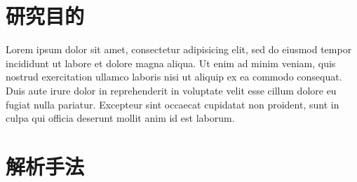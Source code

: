 \documentclass[a4j,10pt, twocolumn]{jarticle}
\begin{document}
\section{研究目的}
Lorem ipsum dolor sit amet, consectetur adipisicing elit, sed do eiusmod tempor incididunt ut labore et dolore magna aliqua. Ut enim ad minim veniam, quis nostrud exercitation ullamco laboris nisi ut aliquip ex ea commodo consequat. Duis aute irure dolor in reprehenderit in voluptate velit esse cillum dolore eu fugiat nulla pariatur. Excepteur sint occaecat cupidatat non proident, sunt in culpa qui officia deserunt mollit anim id est laborum.
\section{解析手法}
\end{document}
